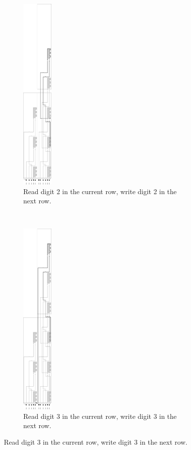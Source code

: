 \begin{figure}[H]
\begin{subfigure}[t]{0.2\textwidth}
        \centering
        \includegraphics[width=0.6in]{counter_read_digit2_return_read_digit3_general_case3_middle_level}
        \caption{\label{fig:counter_read_digit2_return_read_digit3_general_case3_middle_level} Read digit 2 in the current row, write digit 2 in the next row.}
    \end{subfigure}%
    ~
    \begin{subfigure}[t]{0.2\textwidth}
        \centering
        \includegraphics[width=0.6in]{counter_read_digit3_return_read_digit1_general_case3_middle_level}
        \caption{\label{fig:counter_read_digit3_return_read_digit1_general_case3_middle_level} Read digit 3 in the current row, write digit 3 in the next row.}
    \end{subfigure}%


\end{figure}
